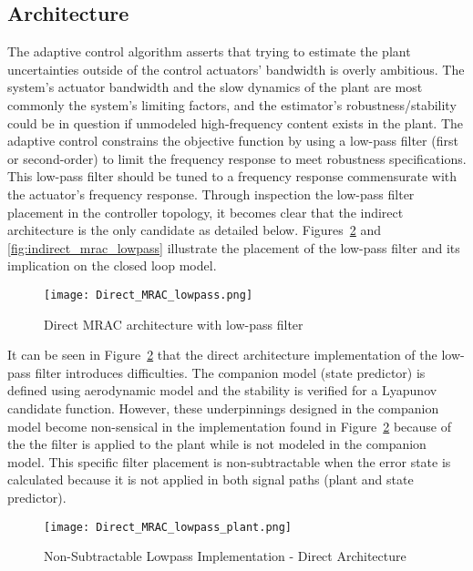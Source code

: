 \subsection{\Lone Architecture}
The \Lone adaptive control algorithm asserts that trying to estimate the plant uncertainties outside of the control actuators' bandwidth is overly ambitious.  The system's actuator bandwidth and the slow dynamics of the plant are most commonly the system's limiting factors, and the estimator's robustness/stability could be in question if unmodeled high-frequency content exists in the plant.  %
The \Lone adaptive control constrains the objective function by using a low-pass filter (first or second-order) to limit the frequency response to meet robustness specifications.  This low-pass filter should be tuned to a frequency response commensurate with the actuator's frequency response.  Through inspection the low-pass filter placement in the controller topology, it becomes clear that the indirect architecture is the only candidate as detailed below.  Figures~\ref{fig:direct_mrac_lowpass} and \ref{fig:indirect_mrac_lowpass} illustrate the placement of the low-pass filter and its implication on the closed loop model. 

\begin{figure}[h!]
 \centering
  \texttt{[image: Direct\_MRAC\_lowpass.png]}
  \caption{Direct \ac{MRAC} architecture with low-pass filter }
  \label{fig:direct_mrac_lowpass}
\end{figure}
 It can be seen in Figure~\ref{fig:direct_mrac_lowpass} that the direct architecture implementation of the low-pass filter introduces difficulties.  The companion model (state predictor) is defined using aerodynamic model and the stability is verified for a Lyapunov candidate function.  However, these underpinnings designed in the companion model become non-sensical in the implementation found in Figure~\ref{fig:direct_mrac_lowpass} because of the the filter is applied to the plant while is not modeled in the companion model.  This specific filter placement is non-subtractable when the error state is calculated because it is not applied in both signal paths (plant and state predictor).
\begin{figure}[h!]
 \centering
  \texttt{[image: Direct\_MRAC\_lowpass\_plant.png]}
  \caption{Non-Subtractable Lowpass Implementation - Direct Architecture}
  \label{fig:direct_mrac_lowpass}
\end{figure}

